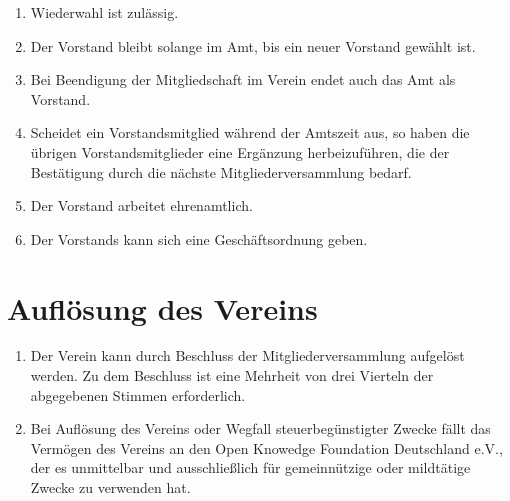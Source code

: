 \documentclass[12pt,a4paper,draft]{article}
\begin{document}
\begin{enumerate}
\item Wiederwahl ist zulässig.

\item Der Vorstand bleibt solange im Amt, bis ein neuer Vorstand gewählt ist.

\item Bei Beendigung der Mitgliedschaft im Verein endet auch das Amt als 
Vorstand.

\item Scheidet ein Vorstandsmitglied während der Amtszeit aus, so haben die 
übrigen Vorstandsmitglieder eine Ergänzung herbeizuführen, die der Bestätigung 
durch die nächste Mitgliederversammlung bedarf.

\item Der Vorstand arbeitet ehrenamtlich. %

\item Der Vorstands kann sich eine Geschäftsordnung geben.
\end{enumerate}

\section{Auflösung des Vereins}
\begin{enumerate}
\item Der Verein kann durch Beschluss der Mitgliederversammlung aufgelöst 
werden. Zu dem Beschluss ist eine Mehrheit von drei Vierteln der abgegebenen 
Stimmen erforderlich. %

\item Bei Auflösung des Vereins oder Wegfall steuerbegünstigter Zwecke fällt 
das Vermögen des Vereins an den Open Knowedge Foundation Deutschland e.V., der 
es unmittelbar und ausschließlich für gemeinnützige oder mildtätige Zwecke zu 
verwenden hat. %
\end{enumerate}
\end{document}
